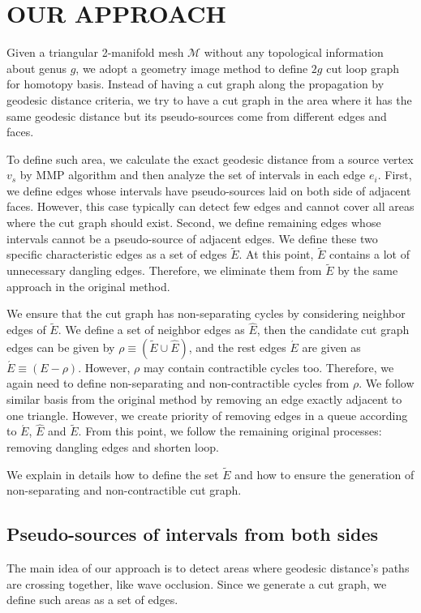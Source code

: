 \documentclass[a4paper,twoside]{article}
\begin{document}
\section{\uppercase{Our Approach}}
\label{sec:our approach}
\noindent Given a triangular 2-manifold mesh $\mathscr{M}$ without any topological information about genus $g$, we adopt a geometry image method \cite{Gu:2002:GI:566654.566589} to define $2g$ cut loop graph for homotopy basis. Instead of having a cut graph along the propagation by geodesic distance criteria, we try to have a cut graph in the area where it has the same geodesic distance but its pseudo-sources come from different edges and faces.

To define such area, we calculate the exact geodesic distance from a source vertex $v_{s}$ by MMP algorithm \cite{Mitchell:1987:DGP:33367.33372} and then  analyze the set of intervals in each edge $e_i$. First, we define edges whose intervals have pseudo-sources laid on both side of adjacent faces. However, this case typically can detect few edges and cannot cover all areas where the cut graph should exist. Second, we define remaining edges whose intervals cannot be a pseudo-source of adjacent edges. We define these two specific characteristic edges as a set of edges $\tilde{E}$. At this point, $\tilde{E}$ contains a lot of unnecessary dangling edges. Therefore, we eliminate them from $\tilde{E}$ by the same approach in the original method.

We ensure that the cut graph has non-separating cycles by considering neighbor edges of $\tilde{E}$. We define a set of neighbor edges as $\hat{E}$, 
then the candidate cut graph edges can be given by $\rho \equiv (\tilde{E} \cup \hat{E})$, and the rest edges $\acute{E}$ are given as $\acute{E} \equiv (E - \rho)$. However, $\rho$ may contain contractible cycles too. Therefore, we again need to define non-separating and non-contractible cycles from $\rho$. We follow similar basis from the original method by removing an edge exactly adjacent to one triangle. However, we create priority of removing edges in a queue according to $\acute{E}$,  $\hat{E}$ and $\tilde{E}$. From this point, we follow the remaining original processes: removing dangling edges and shorten loop.

We explain in details how to define the set $\tilde{E}$ and how to ensure the generation of non-separating and non-contractible cut graph.


\subsection{Pseudo-sources of intervals from both sides}
\label{subsec:pseudo-sources laid on both side of adjacent faces}
The main idea of our approach is to detect areas where geodesic distance's paths are crossing together, like wave occlusion. Since we generate a cut graph, we define such areas as a set of edges.
\end{document}
